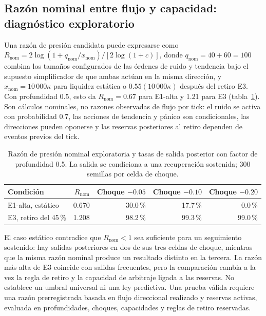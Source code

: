 \subsection{Razón nominal entre flujo y capacidad: diagnóstico exploratorio}

Una razón de presión candidata puede expresarse como $R_{\mathrm{nom}}=2\log(1+q_{\mathrm{nom}}/x_{\mathrm{nom}})/[2\log(1+c)]$, donde $q_{\mathrm{nom}}=40+60=100$ combina los tamaños configurados de las órdenes de ruido y tendencia bajo el supuesto simplificador de que ambas actúan en la misma dirección, y $x_{\mathrm{nom}}=10\,000\kappa$ para liquidez estática o $0.55(10\,000\kappa)$ después del retiro E3. Con profundidad 0.5, esto da $R_{\mathrm{nom}}=0.67$ para E1-alta y 1.21 para E3 (tabla~\ref{tab:pressure-ratio}). Son cálculos nominales, no razones observadas de flujo por tick: el ruido se activa con probabilidad 0.7, las acciones de tendencia y pánico son condicionales, las direcciones pueden oponerse y las reservas posteriores al retiro dependen de eventos previos del tick.

\begin{table}[htbp]
\centering
\caption{Razón de presión nominal exploratoria y tasas de salida posterior con factor de profundidad 0.5. La salida se condiciona a una recuperación sostenida; 300 semillas por celda de choque.}
\label{tab:pressure-ratio}
\small
\begin{tabularx}{\textwidth}{@{}Xrrrr@{}}
\toprule
Condición & $R_{\mathrm{nom}}$ & Choque $-0.05$ & Choque $-0.10$ & Choque $-0.20$ \\
\midrule
E1-alta, estático & 0.670 & 30.0\,\% & 17.7\,\% & 0.0\,\% \\
E3, retiro del 45\,\% & 1.208 & 98.2\,\% & 99.3\,\% & 99.0\,\% \\
\bottomrule
\end{tabularx}
\end{table}

El caso estático contradice que $R_{\mathrm{nom}}<1$ sea suficiente para un seguimiento sostenido: hay salidas posteriores en dos de sus tres celdas de choque, mientras que la misma razón nominal produce un resultado distinto en la tercera. La razón más alta de E3 coincide con salidas frecuentes, pero la comparación cambia a la vez la regla de retiro y la capacidad de arbitraje ligada a las reservas. No establece un umbral universal ni una ley predictiva. Una prueba válida requiere una razón prerregistrada basada en flujo direccional realizado y reservas activas, evaluada en profundidades, choques, capacidades y reglas de retiro reservadas.

